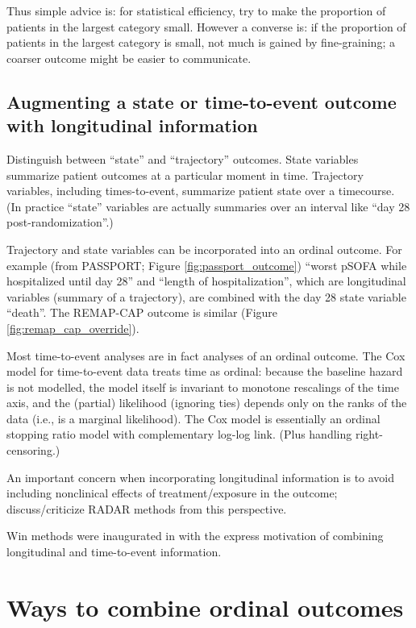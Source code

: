 \documentclass[
  11pt,
  fleqn
]{article}
\begin{document}
Thus simple advice is: for statistical efficiency, try to make the proportion
of patients in the largest category small. However a converse is: if the
proportion of patients in the largest category is small, not much is gained by
fine-graining; a coarser outcome might be easier to communicate.

\subsection{Augmenting a state or time-to-event outcome with
longitudinal information}

Distinguish between ``state'' and ``trajectory'' outcomes. State
variables summarize patient outcomes at a particular moment in time.
Trajectory variables, including times-to-event, summarize patient
state over a timecourse. (In practice ``state'' variables are
actually summaries over an interval like ``day 28 post-randomization''.)

Trajectory and state variables can be incorporated into an ordinal outcome. For
example (from PASSPORT; Figure \ref{fig:passport_outcome}) ``worst pSOFA while
hospitalized until day 28'' and ``length of hospitalization'', which are
longitudinal variables (summary of a trajectory), are combined with the day 28
state variable ``death''. The REMAP-CAP outcome is similar (Figure
\ref{fig:remap_cap_override}).

Most time-to-event analyses are in fact analyses of an ordinal outcome. The Cox
model for time-to-event data treats time as ordinal: because the baseline
hazard is not modelled, the model itself is invariant to monotone rescalings of
the time axis, and the (partial) likelihood (ignoring ties) depends only on the
ranks of the data (i.e., is a marginal likelihood). The Cox model is
essentially an ordinal stopping ratio model with complementary log-log link.
(Plus handling right-censoring.)

An important concern when incorporating longitudinal information is
to avoid including nonclinical effects of treatment/exposure in the
outcome; \citet{ongUnlockingDOORHow2023} discuss/criticize RADAR
methods from this perspective.

Win methods were inaugurated in
\citet{finkelsteinCombiningMortalityLongitudinal1999} with the
express motivation of combining longitudinal and time-to-event information.

\section{Ways to combine ordinal outcomes}
\end{document}
